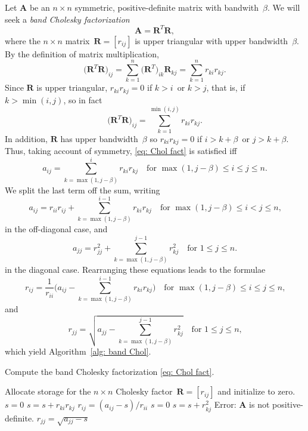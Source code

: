 Let $\boldsymbol{A}$ be an $n\times n$ symmetric, positive-definite matrix
with bandwith~$\beta$.  We will seek a \emph{band Cholesky factorization}
\begin{equation}\label{eq: Chol fact}
\boldsymbol{A}=\boldsymbol{R}^T\boldsymbol{R},
\end{equation}
where the $n\times n$ matrix~$\boldsymbol{R}=[r_{ij}]$ is upper triangular with 
upper bandwidth~$\beta$.  By the definition of matrix multiplication,
\[
\bigl(\boldsymbol{R}^T\boldsymbol{R}\bigr)_{ij}
	=\sum_{k=1}^n\bigl(\boldsymbol{R}^T\bigr)_{ik}\boldsymbol{R}_{kj}
	=\sum_{k=1}^n r_{ki}r_{kj}.
\]
Since $\boldsymbol{R}$ is upper triangular, $r_{ki}r_{kj}=0$ if $k>i$~or $k>j$,
that is, if $k>\min(i,j)$, so in fact
\[
\bigl(\boldsymbol{R}^T\boldsymbol{R}\bigr)_{ij}
	=\sum_{k=1}^{\min(i,j)} r_{ki}r_{kj}.
\]
In addition, $\boldsymbol{R}$ has upper bandwidth~$\beta$ so $r_{ki}r_{kj}=0$ 
if $i>k+\beta$~or $j>k+\beta$.  Thus, taking account of symmetry, 
\eqref{eq: Chol fact} is satisfied iff
\[
a_{ij}=\sum_{k=\max(1,j-\beta)}^ir_{ki}r_{kj}
	\quad\text{for $\max(1,j-\beta)\le i\le j\le n$.}
\]
We split the last term off the sum, writing
\[
a_{ij}=r_{ii}r_{ij}+\sum_{k=\max(1,j-\beta)}^{i-1}r_{ki}r_{kj}
	\quad\text{for $\max(1,j-\beta)\le i<j\le n$,}
\]
in the off-diagonal case, and
\[
a_{jj}=r_{jj}^2+\sum_{k=\max(1,j-\beta)}^{j-1}r_{kj}^2
	\quad\text{for $1\le j\le n$.}
\]
in the diagonal case.  Rearranging these equations leads to the formulae
\[
r_{ij}=\frac{1}{r_{ii}}\biggl(a_{ij}-\sum_{k=\max(1,j-\beta)}^{i-1}r_{ki}r_{kj}
	\biggr)\quad\text{for $\max(1,j-\beta)\le i\le j\le n$,}
\]
and
\[
r_{jj}=\sqrt{a_{jj}-\sum_{k=\max(1,j-\beta)}^{j-1}r_{kj}^2}
	\quad\text{for $1\le j\le n$,}
\]
which yield Algorithm~\ref{alg: band Chol}.

\begin{algorithm}
\caption{Compute the band Cholesky factorization \eqref{eq: Chol fact}.}
\label{alg: band Chol}
\begin{algorithmic}
\State
{}
\State Allocate storage for the $n\times n$ Cholesky 
factor~$\boldsymbol{R}=[r_{ij}]$ and initialize to zero.
        \State $s=0$
            \State $s=s+r_{ki}r_{kj}$
        \EndFor
        \State $r_{ij}=(a_{ij}-s)/r_{ii}$
    \EndFor
    \State $s=0$
        \State $s=s+r_{kj}^2$
    \EndFor
        \State Error: $\boldsymbol{A}$ is not positive-definite.
    \EndIf
    \State $r_{jj}=\sqrt{a_{jj}-s}$
\EndFor
\State{}
\EndFunction
\end{algorithmic}
\end{algorithm}

